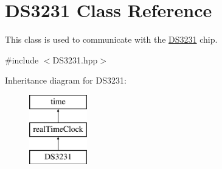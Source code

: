 \hypertarget{class_d_s3231}{}\section{D\+S3231 Class Reference}
\label{class_d_s3231}


This class is used to communicate with the \mbox{\hyperlink{class_d_s3231}{D\+S3231}} chip.  




{\ttfamily \#include $<$D\+S3231.\+hpp$>$}

Inheritance diagram for D\+S3231\+:\begin{figure}[H]
\begin{center}
\leavevmode
\includegraphics[height=3.000000cm]{class_d_s3231}
\end{center}
\end{figure}
